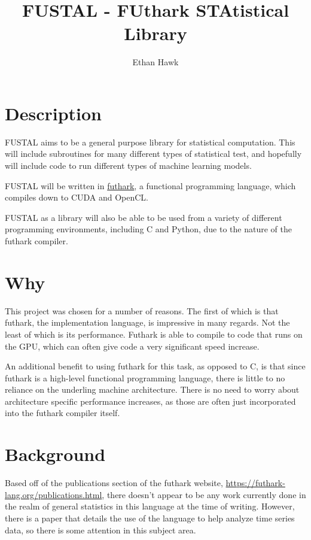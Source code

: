 \documentclass{article}
\author{Ethan Hawk}
\title{FUSTAL - \textbf{FU}thark \textbf{STA}tistical \textbf{L}ibrary}
\begin{document}
\maketitle
\tableofcontents

\newpage
\section{Description}

FUSTAL aims to be a general purpose library for statistical computation.
This will include subroutines for many different types of statistical test,
and hopefully will include code to run different types of machine learning
models.

FUSTAL will be written in \href{https://futhark-lang.org/}{futhark}, a
functional programming language, which compiles down to CUDA and OpenCL.

FUSTAL as a library will also be able to be used from a variety of different
programming environments, including C and Python, due to the nature of the
futhark compiler.

\section{Why}

This project was chosen for a number of reasons. The first of which is that
futhark, the implementation language, is impressive in many regards. Not the
least of which is its performance. Futhark is able to compile to code that runs
on the GPU, which can often give code a very significant speed increase.

An additional benefit to using futhark for this task, as opposed to C, is that
since futhark is a high-level functional programming language, there is little
to no reliance on the underling machine architecture. There is no need to worry
about architecture specific performance increases, as those are often just
incorporated into the futhark compiler itself.

\section{Background}

Based off of the publications section of the futhark website,
\href{https://futhark-lang.org/publications.html}{https://futhark-lang.org/publications.html},
there doesn't appear to be any work currently done in the realm of general statistics in
this language at the time of writing. However, there is a paper that details
the use of the language to help analyze time series data, so there is some
attention in this subject area.
\end{document}
